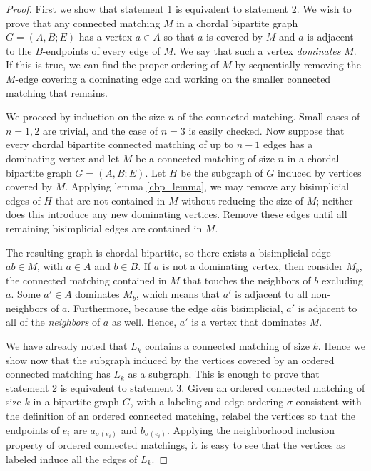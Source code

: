 \begin{proof}
%
First we show that statement 1 is equivalent to statement 2.  We wish to prove that any connected matching $M$ in a chordal bipartite graph $G = (A,B; E)$ has a vertex $a \in A$ so that $a$ is covered by $M$ and $a$ is adjacent to the $B$-endpoints of every edge of $M$.  
%
We say that such a vertex {\it dominates} $M$.  
%
If this is true, we can find the proper ordering of $M$ by sequentially removing the $M$-edge covering a dominating edge and working on the smaller connected matching that remains.

We proceed by induction on the size $n$ of the connected matching.  
%
Small cases of $n = 1,2$ are trivial, and the case of $n=3$ is easily checked.  
%
Now suppose that every chordal bipartite connected matching of up to $n-1$ edges has a dominating vertex and let $M$ be a connected matching of size $n$ in a chordal bipartite graph $G = (A,B;E)$.  
%
Let $H$ be the subgraph of $G$ induced by vertices covered by $M$.
%
Applying lemma \ref{cbp_lemma}, we may remove any bisimplicial edges of $H$ that are not contained in $M$ without reducing the size of $M$; neither does this introduce any new dominating vertices.  
%
Remove these edges until all remaining bisimplicial edges are contained in $M$.  

The resulting graph is chordal bipartite, so there exists a bisimplicial edge $ab \in M$, with $a \in A$ and $b \in B$.  
%
If $a$ is not a dominating vertex, then consider $M_b$, the connected matching contained in $M$ that touches the neighbors of $b$ excluding $a$.  
%
%
Some $a' \in A$ dominates $M_b$, which means that $a'$ is adjacent to all non-neighbors of $a$.  
%
Furthermore, because the edge $ab$is bisimplicial, $a'$ is adjacent to all of the {\it neighbors} of $a$ as well.  
%
 Hence, $a'$ is a vertex that dominates $M$.  

 We have already noted that $L_k$ contains a connected matching of size $k$. Hence we show now that the subgraph induced by the vertices covered by an ordered connected matching has $L_k$ as a subgraph. This is enough to prove that statement 2 is equivalent to statement 3.
%
 Given an ordered connected matching of size $k$ in a bipartite graph $G$, with a labeling and edge ordering $\sigma$ consistent with the definition of an ordered connected matching, relabel the vertices so that the endpoints of $e_i$ are $a_{\sigma(e_i)}$ and $b_{\sigma(e_i)}$.  Applying the neighborhood inclusion property of ordered connected matchings, it is easy to see that the vertices as labeled induce all the edges of $L_k$.


\end{proof}
